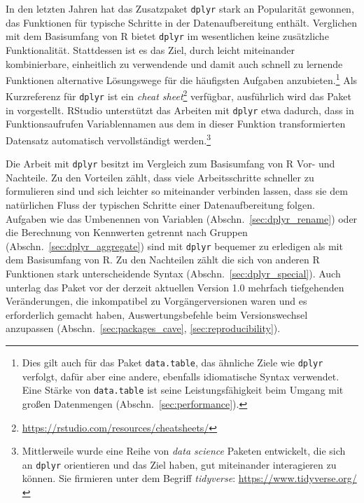In den letzten Jahren hat das Zusatzpaket \lstinline!dplyr! stark an Popularität gewonnen, das Funktionen für typische Schritte in der Datenaufbereitung enthält. Verglichen mit dem Basisumfang von R bietet \lstinline!dplyr! im wesentlichen keine zusätzliche Funktionalität. Stattdessen ist es das Ziel, durch leicht miteinander kombinierbare, einheitlich zu verwendende und damit auch schnell zu lernende Funktionen alternative Lösungswege für die häufigsten Aufgaben anzubieten.\footnote{Dies gilt auch für das Paket \lstinline!data.table!, das ähnliche Ziele wie \lstinline!dplyr! verfolgt, dafür aber eine andere, ebenfalls idiomatische Syntax verwendet. Eine Stärke von \lstinline!data.table! ist seine Leistungsfähigkeit beim Umgang mit großen Datenmengen (Abschn.\ \ref{sec:performance}).} Als Kurzreferenz für \lstinline!dplyr! ist ein \emph{cheat sheet}\footnote{\url{https://rstudio.com/resources/cheatsheets/}} verfügbar, ausführlich wird das Paket in  vorgestellt. RStudio unterstützt das Arbeiten mit \lstinline!dplyr! etwa dadurch, dass in Funktionsaufrufen Variablennamen aus dem in dieser Funktion transformierten Datensatz automatisch vervollständigt werden.\footnote{Mittlerweile wurde eine Reihe von \emph{data science} Paketen entwickelt, die sich an \lstinline!dplyr! orientieren und das Ziel haben, gut miteinander interagieren zu können. Sie firmieren unter dem Begriff \emph{tidyverse}: \url{https://www.tidyverse.org/}}

Die Arbeit mit \lstinline!dplyr! besitzt im Vergleich zum Basisumfang von R Vor- und Nachteile. Zu den Vorteilen zählt, dass viele Arbeitsschritte schneller zu formulieren sind und sich leichter so miteinander verbinden lassen, dass sie dem natürlichen Fluss der typischen Schritte einer Datenaufbereitung folgen. Aufgaben wie das Umbenennen von Variablen (Abschn.\ \ref{sec:dplyr_rename}) oder die Berechnung von Kennwerten getrennt nach Gruppen (Abschn.\ \ref{sec:dplyr_aggregate}) sind mit \lstinline!dplyr! bequemer zu erledigen als mit dem Basisumfang von R. Zu den Nachteilen zählt die sich von anderen R Funktionen stark unterscheidende Syntax (Abschn.\ \ref{sec:dplyr_special}). Auch unterlag das Paket vor der derzeit aktuellen Version 1.0 mehrfach tiefgehenden Veränderungen, die inkompatibel zu Vorgängerversionen waren und es erforderlich gemacht haben, Auswertungsbefehle beim Versionswechsel anzupassen (Abschn.\ \ref{sec:packages_cave}, \ref{sec:reproducibility}).

